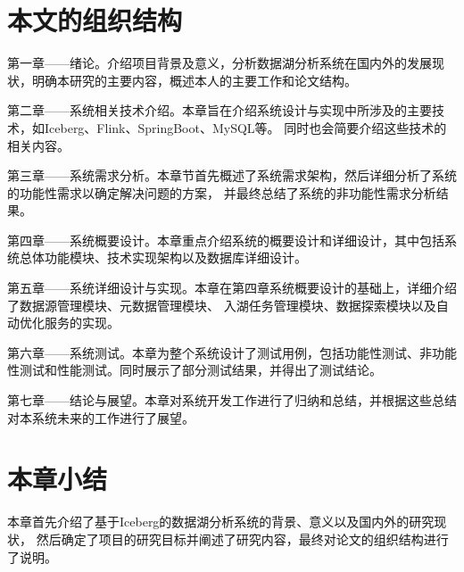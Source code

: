 \section{本文的组织结构}

第一章——绪论。介绍项目背景及意义，分析数据湖分析系统在国内外的发展现状，明确本研究的主要内容，概述本人的主要工作和论文结构。

第二章——系统相关技术介绍。本章旨在介绍系统设计与实现中所涉及的主要技术，如Iceberg、Flink、SpringBoot、MySQL等。
同时也会简要介绍这些技术的相关内容。

第三章——系统需求分析。本章节首先概述了系统需求架构，然后详细分析了系统的功能性需求以确定解决问题的方案，
并最终总结了系统的非功能性需求分析结果。

第四章——系统概要设计。本章重点介绍系统的概要设计和详细设计，其中包括系统总体功能模块、技术实现架构以及数据库详细设计。

第五章——系统详细设计与实现。本章在第四章系统概要设计的基础上，详细介绍了数据源管理模块、元数据管理模块、
入湖任务管理模块、数据探索模块以及自动优化服务的实现。

第六章——系统测试。本章为整个系统设计了测试用例，包括功能性测试、非功能性测试和性能测试。同时展示了部分测试结果，并得出了测试结论。

第七章——结论与展望。本章对系统开发工作进行了归纳和总结，并根据这些总结对本系统未来的工作进行了展望。

\section{本章小结}

本章首先介绍了基于Iceberg的数据湖分析系统的背景、意义以及国内外的研究现状，
然后确定了项目的研究目标并阐述了研究内容，最终对论文的组织结构进行了说明。
